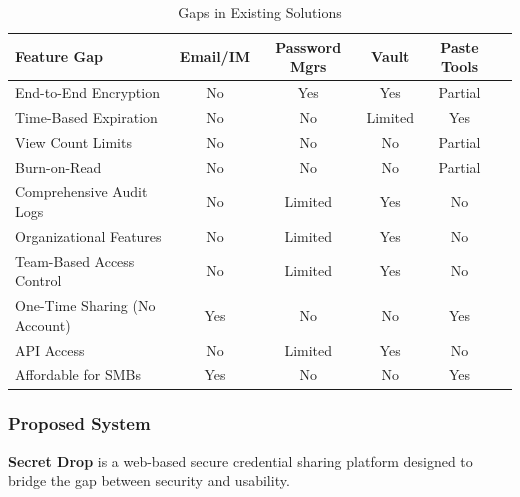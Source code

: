 \documentclass[12pt,a4paper]{article}
\begin{document}
\begin{table}[H]
  \centering
  \small
  \caption{Gaps in Existing Solutions}
  \begin{tabular}{@{}lccccc@{}}
    \toprule
    \textbf{Feature Gap}          & \textbf{Email/IM} & \textbf{Password Mgrs} & \textbf{Vault} & \textbf{Paste Tools} \\
    \midrule
    End-to-End Encryption         & No                & Yes                    & Yes            & Partial              \\
    \hline
    Time-Based Expiration         & No                & No                     & Limited        & Yes                  \\
    \hline
    View Count Limits             & No                & No                     & No             & Partial              \\
    \hline
    Burn-on-Read                  & No                & No                     & No             & Partial              \\
    \hline
    Comprehensive Audit Logs      & No                & Limited                & Yes            & No                   \\
    \hline
    Organizational Features       & No                & Limited                & Yes            & No                   \\
    \hline
    Team-Based Access Control     & No                & Limited                & Yes            & No                   \\
    \hline
    One-Time Sharing (No Account) & Yes               & No                     & No             & Yes                  \\
    \hline
    API Access                    & No                & Limited                & Yes            & No                   \\
    \hline
    Affordable for SMBs           & Yes               & No                     & No             & Yes                  \\
    \bottomrule
  \end{tabular}
\end{table}

\subsubsection{Proposed System}

\textbf{Secret Drop} is a web-based secure credential sharing platform designed to bridge the gap between security and usability.
\end{document}
